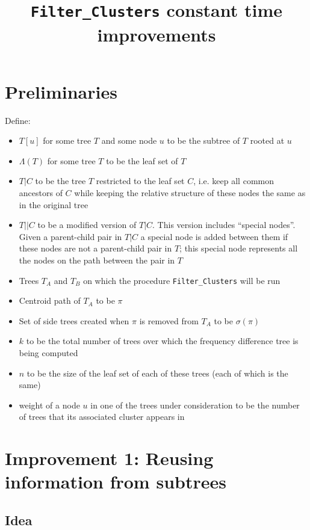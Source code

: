 \documentclass[a4paper]{article}
\title{\texttt{Filter\_Clusters} constant time improvements}
\begin{document}
    \maketitle

        \section{Preliminaries}
    Define:
    \begin{itemize}
        \item $T[u]$ for some tree $T$ and some node $u$ to be the subtree of $T$ rooted at $u$
        \item $\Lambda(T)$ for some tree $T$ to be the leaf set of $T$
        \item $T|C$ to be the tree $T$ restricted to the leaf set $C$, i.e. keep all common ancestors of $C$ while keeping the relative structure of these nodes the same as in the original tree
        \item $T||C$ to be a modified version of $T|C$. This version includes ``special nodes''. Given a parent-child pair in $T|C$ a special node is added between them if these nodes are not a parent-child pair in $T$; this special node represents all the nodes on the path between the pair in $T$
        \item Trees $T_A$ and $T_B$ on which the procedure \texttt{Filter\_Clusters} will be run
        \item Centroid path of $T_A$ to be $\pi$
        \item Set of side trees created when $\pi$ is removed from $T_A$ to be $\sigma(\pi)$
        \item $k$ to be the total number of trees over which the frequency difference tree is being computed
        \item $n$ to be the size of the leaf set of each of these trees (each of which is the same)
        \item weight of a node $u$ in one of the trees under consideration to be the number of trees that its associated cluster appears in
    \end{itemize}

    \section{Improvement 1: Reusing information from subtrees}

    \subsection{Idea}
\end{document}
